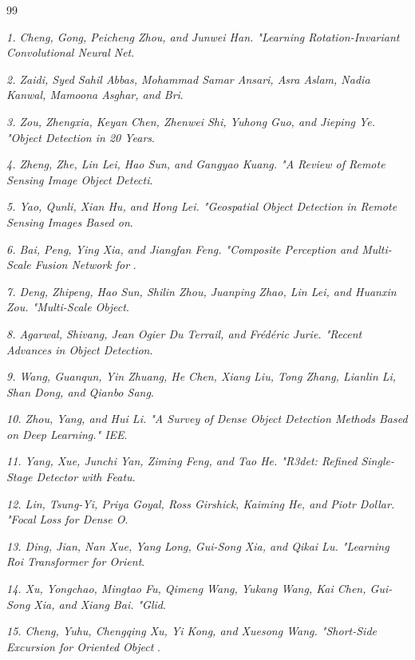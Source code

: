 \documentclass[10pt,twocolumn,final]{article}
\begin{document}
\begin{thebibliography}{99}

\textit{1.	Cheng, Gong, Peicheng Zhou, and Junwei Han. "Learning Rotation-Invariant Convolutional Neural Net}.

\textit{2.	Zaidi, Syed Sahil Abbas, Mohammad Samar Ansari, Asra Aslam, Nadia Kanwal, Mamoona Asghar, and Bri}.

\textit{3.	Zou, Zhengxia, Keyan Chen, Zhenwei Shi, Yuhong Guo, and Jieping Ye. "Object Detection in 20 Years}.

\textit{4.	Zheng, Zhe, Lin Lei, Hao Sun, and Gangyao Kuang. "A Review of Remote Sensing Image Object Detecti}.

\textit{5.	Yao, Qunli, Xian Hu, and Hong Lei. "Geospatial Object Detection in Remote Sensing Images Based on}.

\textit{6.	Bai, Peng, Ying Xia, and Jiangfan Feng. "Composite Perception and Multi-Scale Fusion Network for }.

\textit{7.	Deng, Zhipeng, Hao Sun, Shilin Zhou, Juanping Zhao, Lin Lei, and Huanxin Zou. "Multi-Scale Object}.

\textit{8.	Agarwal, Shivang, Jean Ogier Du Terrail, and Frédéric Jurie. "Recent Advances in Object Detection}.

\textit{9.	Wang, Guanqun, Yin Zhuang, He Chen, Xiang Liu, Tong Zhang, Lianlin Li, Shan Dong, and Qianbo Sang}.

\textit{10.	Zhou, Yang, and Hui Li. "A Survey of Dense Object Detection Methods Based on Deep Learning." IEE}.

\textit{11.	Yang, Xue, Junchi Yan, Ziming Feng, and Tao He. "R3det: Refined Single-Stage Detector with Featu}.

\textit{12.	Lin, Tsung-Yi, Priya Goyal, Ross Girshick, Kaiming He, and Piotr Dollar. "Focal Loss for Dense O}.

\textit{13.	Ding, Jian, Nan Xue, Yang Long, Gui-Song Xia, and Qikai Lu. "Learning Roi Transformer for Orient}.

\textit{14.	Xu, Yongchao, Mingtao Fu, Qimeng Wang, Yukang Wang, Kai Chen, Gui-Song Xia, and Xiang Bai. "Glid}.

\textit{15.	Cheng, Yuhu, Chengqing Xu, Yi Kong, and Xuesong Wang. "Short-Side Excursion for Oriented Object }.


\end{thebibliography}
\end{document}

